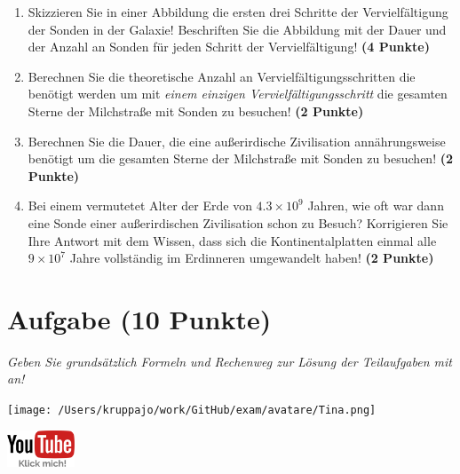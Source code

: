\documentclass[a4paper, 9pt]{scrartcl}\usepackage[]{graphicx}\usepackage[]{xcolor}
\begin{document}
\begin{enumerate}
\item Skizzieren Sie in einer Abbildung die ersten drei Schritte der Vervielfältigung der Sonden in der Galaxie! Beschriften Sie die Abbildung mit der Dauer und der Anzahl an Sonden für jeden Schritt der Vervielfältigung! \textbf{(4 Punkte)}
\item Berechnen Sie die theoretische Anzahl an Vervielfältigungsschritten die benötigt werden um mit \textit{einem einzigen Vervielfältigungsschritt} die gesamten Sterne der Milchstraße mit Sonden zu besuchen! \textbf{(2 Punkte)}
\item Berechnen Sie die Dauer, die eine außerirdische Zivilisation annährungsweise benötigt um die gesamten Sterne der Milchstraße mit Sonden zu besuchen! \textbf{(2 Punkte)}
\item Bei einem vermutetet Alter der Erde von $\ensuremath{4.3\times 10^{9}}$ Jahren, wie oft war dann eine Sonde einer außerirdischen Zivilisation schon zu Besuch? Korrigieren Sie Ihre Antwort mit dem Wissen, dass sich die Kontinentalplatten einmal alle $\ensuremath{9\times 10^{7}}$ Jahre vollständig im Erdinneren umgewandelt haben! \textbf{(2 Punkte)}
\end{enumerate}


 
\clearpage

\section{Aufgabe \hfill (10 Punkte)}

\textit{Geben Sie grundsätzlich Formeln und Rechenweg zur Lösung der Teilaufgaben mit an!} \\[1Ex]
 

 
\begin{minipage}[t]{0.5\textwidth}
\texttt{[image: /Users/kruppajo/work/GitHub/exam/avatare/Tina.png]}
\end{minipage}
\begin{minipage}[t]{0.5\textwidth}
\hfill
\href{https://youtu.be/tDgr6fpkkYA}{\includegraphics[width = 2cm]{img/youtube}}
\end{minipage}
\end{document}
